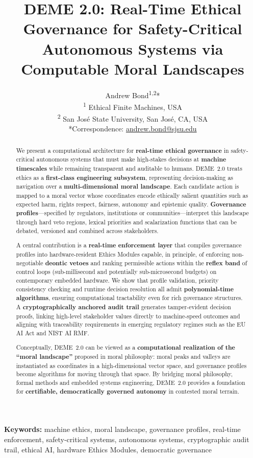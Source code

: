 \documentclass[11pt]{article}
\title{DEME 2.0: Real-Time Ethical Governance for Safety-Critical Autonomous Systems via Computable Moral Landscapes}
\author{Andrew Bond\textsuperscript{1,2}*\\[6pt]
\textsuperscript{1} Ethical Finite Machines, USA\\
\textsuperscript{2} San Jos\'{e} State University, San Jos\'{e}, CA, USA\\[6pt]
*Correspondence: \href{mailto:andrew.bond@sjsu.edu}{andrew.bond@sjsu.edu}}
\date{}
\begin{document}
\maketitle

\noindent\textbf{Keywords:} machine ethics, moral landscape, governance profiles, real-time enforcement, safety-critical systems, autonomous systems, cryptographic audit trail, ethical AI, hardware Ethics Modules, democratic governance

\begin{abstract}
We present a computational architecture for \textbf{real-time ethical governance} in safety-critical autonomous systems that must make high-stakes decisions at \textbf{machine timescales} while remaining transparent and auditable to humans. DEME~2.0 treats ethics as a \textbf{first-class engineering subsystem}, representing decision-making as navigation over a \textbf{multi-dimensional moral landscape}. Each candidate action is mapped to a moral vector whose coordinates encode ethically salient quantities such as expected harm, rights respect, fairness, autonomy and epistemic quality. \textbf{Governance profiles}---specified by regulators, institutions or communities---interpret this landscape through hard veto regions, lexical priorities and scalarization functions that can be debated, versioned and combined across stakeholders.

A central contribution is a \textbf{real-time enforcement layer} that compiles governance profiles into hardware-resident Ethics Modules capable, in principle, of enforcing non-negotiable \textbf{deontic vetoes} and ranking permissible actions within the \textbf{reflex band} of control loops (sub-millisecond and potentially sub-microsecond budgets) on contemporary embedded hardware. We show that profile validation, priority consistency checking and runtime decision resolution all admit \textbf{polynomial-time algorithms}, ensuring computational tractability even for rich governance structures. A \textbf{cryptographically anchored audit trail} generates tamper-evident decision proofs, linking high-level stakeholder values directly to machine-speed outcomes and aligning with traceability requirements in emerging regulatory regimes such as the EU AI Act and NIST AI RMF.

Conceptually, DEME~2.0 can be viewed as a \textbf{computational realization of the ``moral landscape''} proposed in moral philosophy: moral peaks and valleys are instantiated as coordinates in a high-dimensional vector space, and governance profiles become algorithms for moving through that space. By bridging moral philosophy, formal methods and embedded systems engineering, DEME~2.0 provides a foundation for \textbf{certifiable, democratically governed autonomy} in contested moral terrain.
\end{abstract}
\end{document}
